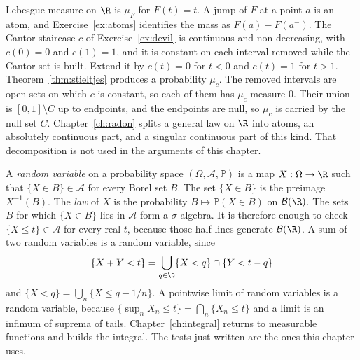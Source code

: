 Lebesgue measure on $\R$ is $\mu_F$ for $F(t)=t$.
A jump of $F$ at a point $a$ is an atom, and Exercise~\ref{ex:atoms} identifies the mass as $F(a)-F(a^-)$.
The Cantor staircase $c$ of Exercise~\ref{ex:devil} is continuous and non-decreasing, with $c(0)=0$ and $c(1)=1$, and it is constant on each interval removed while the Cantor set is built.
Extend it by $c(t)=0$ for $t<0$ and $c(t)=1$ for $t>1$.
Theorem~\ref{thm:stieltjes} produces a probability $\mu_c$.
The removed intervals are open sets on which $c$ is constant, so each of them has $\mu_c$-measure $0$.
Their union is $[0,1]\setminus C$ up to endpoints, and the endpoints are null, so $\mu_c$ is carried by the null set $C$.
Chapter~\ref{ch:radon} splits a general law on $\R$ into atoms, an absolutely continuous part, and a singular continuous part of this kind.
That decomposition is not used in the arguments of this chapter.

A \emph{random variable} on a probability space $(\Omega,\mathcal A,\mathbb P)$ is a map $X:\Omega\to\R$ such that $\{X\in B\}\in\mathcal A$ for every Borel set $B$.
The set $\{X\in B\}$ is the preimage $X^{-1}(B)$.
The \emph{law} of $X$ is the probability $B\mapsto\mathbb P(X\in B)$ on $\mathcal B(\R)$.
The sets $B$ for which $\{X\in B\}$ lies in $\mathcal A$ form a $\sigma$-algebra.
It is therefore enough to check $\{X\le t\}\in\mathcal A$ for every real $t$, because those half-lines generate $\mathcal B(\R)$.
A sum of two random variables is a random variable, since
\[
\{X+Y<t\}=\bigcup_{q\in\Q}\{X<q\}\cap\{Y<t-q\}
\]
and $\{X<q\}=\bigcup_n\{X\le q-1/n\}$.
A pointwise limit of random variables is a random variable, because $\{\sup_n X_n\le t\}=\bigcap_n\{X_n\le t\}$ and a limit is an infimum of suprema of tails.
Chapter~\ref{ch:integral} returns to measurable functions and builds the integral.
The tests just written are the ones this chapter uses.

